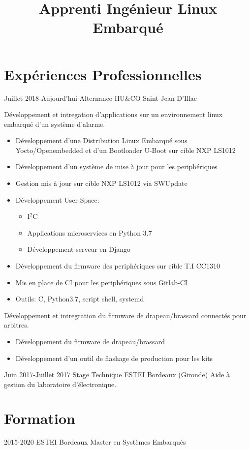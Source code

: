\documentclass[9pts,a4paper,sans]{moderncv}
\title{Apprenti Ingénieur Linux Embarqué }
\begin{document}
\maketitle

\section{Expériences Professionnelles}
\cventry{} {Juillet 2018-Aujourd'hui} {Alternance} {HU\&CO} {Saint Jean D'Illac} {
	Développement et intregation d'applications sur un environnement linux embarqué d'un système d'alarme.
	\begin{itemize}
		\item Développement d'une Distribution Linux Embarqué sous Yocto/Openembedded et d'un Bootloader U-Boot sur cible NXP LS1012
		\item Développement d'un système de mise à jour pour les periphériques
		\item Gestion mis à jour sur cible NXP LS1012 via SWUpdate 
		\item Développement User Space:
		\begin{itemize}
			\item I$^{2}$C
			\item Applications microservices en Python 3.7
			\item Développement serveur en Django
		\end{itemize}
		\item Développement du firmware des periphériques sur cible T.I CC1310
		\item Mis en place de CI pour les periphériques sous Gitlab-CI 
		\item Outils: C, Python3.7, script shell, systemd 
	\end{itemize}
	Développement et intregration du firmware de drapeau/brassard connectés pour arbitres.
	\begin{itemize}
		\item Développement du firmware de drapeau/brassard
		\item Développement d'un outil de flashage de production pour les kits
	\end{itemize}
}

\cventry{} {Juin 2017-Juillet 2017} {Stage Technique} {ESTEI} {Bordeaux (Gironde)} {Aide à gestion du laboratoire d’électronique.} {}
{} {}

\section{Formation}
\cventry{} {2015-2020} {ESTEI} {Bordeaux} {Master en Systèmes Embarqués} {}
\end{document}
